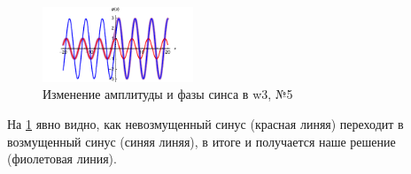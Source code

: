 \begin{figure}[ht]
    \centering
    \includegraphics[width=0.4\textwidth]{figures/w3.pdf}
    \caption{Изменение амплитуды и фазы синса в w3, №5 }
    \label{fig:w3}
\end{figure}

На \ref{fig:w3} явно видно, как невозмущенный синус (красная линяя) переходит в возмущенный синус (синяя линяя), в итоге и получается наше решение (фиолетовая линия). 



